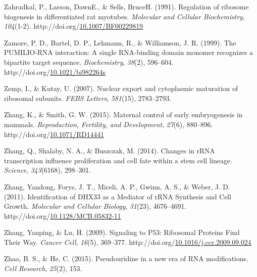 \documentclass[12pt,oneside]{reedthesis}
\newlength{\cslhangindent}
\newenvironment{CSLReferences}[2] %
 {%
  \setlength{\parindent}{0pt}
  \ifodd #1 \everypar{\setlength{\hangindent}{\cslhangindent}}\ignorespaces\fi
  \ifnum #2 > 0
  \setlength{\parskip}{#2\baselineskip}
  \fi
 }%
 {}
\begin{document}
\begin{CSLReferences}{1}{0}
\leavevmode{}%
Zahradkal, P., Larson, DawnE., \& Sells, BruceH. (1991). Regulation of ribosome biogenesis in differentiated rat myotubes. \emph{Molecular and Cellular Biochemistry}, \emph{104}(1-2). http://doi.org/\href{https://doi.org/10.1007/BF00229819}{10.1007/BF00229819}

\leavevmode{}%
Zamore, P. D., Bartel, D. P., Lehmann, R., \& Williamson, J. R. (1999). The {PUMILIO}-{RNA} interaction: A single {RNA}-binding domain monomer recognizes a bipartite target sequence. \emph{Biochemistry}, \emph{38}(2), 596--604. http://doi.org/\href{https://doi.org/10.1021/bi982264s}{10.1021/bi982264s}

\leavevmode{}%
Zemp, I., \& Kutay, U. (2007). Nuclear export and cytoplasmic maturation of ribosomal subunits. \emph{FEBS Letters}, \emph{581}(15), 2783--2793.

\leavevmode{}%
Zhang, K., \& Smith, G. W. (2015). Maternal control of early embryogenesis in mammals. \emph{Reproduction, Fertility, and Development}, \emph{27}(6), 880--896. http://doi.org/\href{https://doi.org/10.1071/RD14441}{10.1071/RD14441}

\leavevmode{}%
Zhang, Q., Shalaby, N. A., \& Buszczak, M. (2014). Changes in {rRNA} transcription influence proliferation and cell fate within a stem cell lineage. \emph{Science}, \emph{343}(6168), 298--301.

\leavevmode{}%
Zhang, Yandong, Forys, J. T., Miceli, A. P., Gwinn, A. S., \& Weber, J. D. (2011). Identification of {DHX33} as a {Mediator} of {rRNA Synthesis} and {Cell Growth}. \emph{Molecular and Cellular Biology}, \emph{31}(23), 4676--4691. http://doi.org/\href{https://doi.org/10.1128/MCB.05832-11}{10.1128/MCB.05832-11}

\leavevmode{}%
Zhang, Yanping, \& Lu, H. (2009). Signaling to P53: {Ribosomal Proteins Find Their Way}. \emph{Cancer Cell}, \emph{16}(5), 369--377. http://doi.org/\href{https://doi.org/10.1016/j.ccr.2009.09.024}{10.1016/j.ccr.2009.09.024}

\leavevmode{}%
Zhao, B. S., \& He, C. (2015). Pseudouridine in a new era of {RNA} modifications. \emph{Cell Research}, \emph{25}(2), 153.


\end{CSLReferences}
\end{document}
